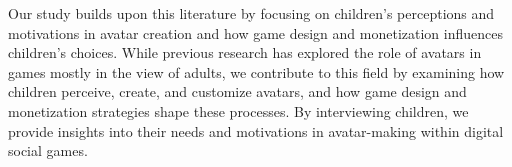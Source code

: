 Our study builds upon this literature by focusing on children's perceptions and motivations in avatar creation and how game design and monetization influences children's choices. While previous research has explored the role of avatars in games mostly in the view of adults, we contribute to this field by examining how children perceive, create, and customize avatars, and how game design and monetization strategies shape these processes. By interviewing children, we provide insights into their needs and motivations in avatar-making within digital social games.